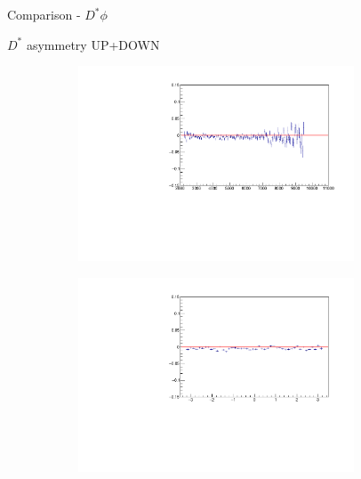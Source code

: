 \documentclass[11pt]{beamer}
\begin{document}
\begin{frame}{Comparison - $D^* \phi$}
\begin{figure}
\end{figure}
\begin{itemize}
\end{itemize}
\end{frame}
\begin{frame}{$D^*$ asymmetry UP+DOWN}
\begin{figure}
\begin{subfigure}{0.45\textwidth}
\includegraphics[width=0.9\textwidth]{up_down_pdf/deviation/h_pT_reco_Dst_pos_dev.pdf}
\end{subfigure}
\begin{subfigure}{0.45\textwidth}
\includegraphics[width=0.9\textwidth]{up_down_pdf/deviation/h_phi_reco_Dst_pos_dev.pdf}

\end{subfigure}
\end{figure}
\end{frame}
\end{document}
